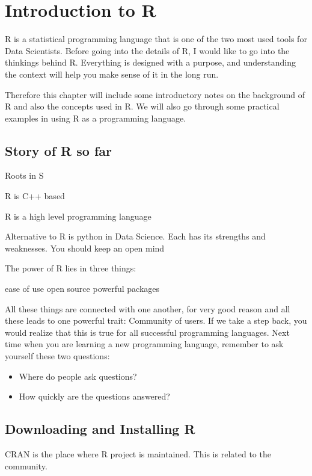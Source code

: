 \section{Introduction to R}

R is a statistical programming language that is one of the two most used tools for Data Scientists.  Before going into the details of R, I would like to go into the thinkings behind R.  Everything is designed with a purpose, and understanding the context will help you make sense of it in the long run.  

Therefore this chapter will include some introductory notes on the background of R and also the concepts used in R.  We will also go through some practical examples in using R as a programming language.  

\subsection{Story of R so far}

Roots in S 

R is C++ based 

R is a high level programming language 

Alternative to R is python in Data Science.  Each has its strengths and weaknesses.  You should keep an open mind 

The power of R lies in three things:

ease of use 
open source 
powerful packages


All these things are connected with one another, for very good reason and all these leads to one powerful trait: Community of users.  If we take a step back, you would realize that this is true for all successful programming languages.  Next time when you are learning a new programming language, remember to ask yourself these two questions:

\begin{itemize}
\item Where do people ask questions?
\item How quickly are the questions answered?
\end{itemize}

\subsection{Downloading and Installing R}

CRAN is the place where R project is maintained.  This is related to the community.  

